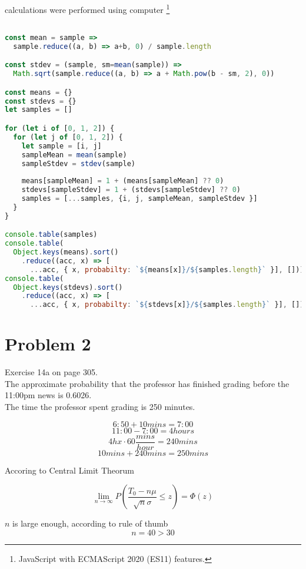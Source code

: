 \documentclass[a4paper,11pt]{article}
\begin{document}
\clearpage

calculations were performed using computer \footnote[1]{JavaScript with ECMAScript 2020 (ES11) features.}
\begin{lstlisting}[language=JavaScript]

const mean = sample => 
  sample.reduce((a, b) => a+b, 0) / sample.length

const stdev = (sample, sm=mean(sample)) =>
  Math.sqrt(sample.reduce((a, b) => a + Math.pow(b - sm, 2), 0))

const means = {}
const stdevs = {}
let samples = []

for (let i of [0, 1, 2]) {
  for (let j of [0, 1, 2]) {
    let sample = [i, j]
    sampleMean = mean(sample)
    sampleStdev = stdev(sample)
    
    means[sampleMean] = 1 + (means[sampleMean] ?? 0)
    stdevs[sampleStdev] = 1 + (stdevs[sampleStdev] ?? 0)
    samples = [...samples, {i, j, sampleMean, sampleStdev }]
  }
}

console.table(samples)
console.table(
  Object.keys(means).sort()
    .reduce((acc, x) => [ 
      ...acc, { x, probabilty: `${means[x]}/${samples.length}` }], []))
console.table(
  Object.keys(stdevs).sort()
    .reduce((acc, x) => [ 
      ...acc, { x, probabilty: `${stdevs[x]}/${samples.length}` }], []))
\end{lstlisting}

\clearpage

\section*{Problem 2}

Exercise 14a on page 305. \\

The approximate probability that the professor has finished grading before the 11:00pm news is 0.6026.\\

The time the professor spent grading is 250 minutes.

\[ 6:50 + 10 mins = 7:00 \]
\[ 11:00 - 7:00  = 4 hours \]
\[ 4h x \cdot 60\frac{mins}{hour} = 240 mins \]
\[ 10 mins + 240 mins = 250 mins \]

Accoring to Central Limit Theorum

\[ \lim_{n \rightarrow \infty} P\left(\frac{T_0 - n \mu}{\sqrt{n} \sigma} \le z \right) = \Phi(z) \]

\vspace{1cm}
$n$ is large enough, according to rule of thumb
\[ n = 40 > 30\]
\end{document}
